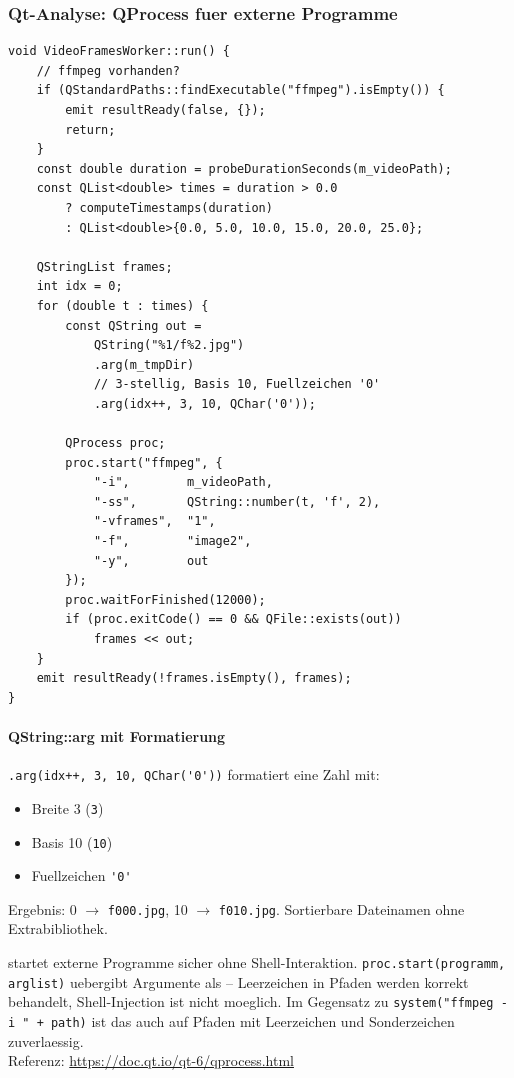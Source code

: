 \subsubsection{Qt-Analyse: QProcess fuer externe Programme}

\begin{lstlisting}[caption={run(): ffmpeg-Frames extrahieren}]
void VideoFramesWorker::run() {
    // ffmpeg vorhanden?
    if (QStandardPaths::findExecutable("ffmpeg").isEmpty()) {
        emit resultReady(false, {});
        return;
    }
    const double duration = probeDurationSeconds(m_videoPath);
    const QList<double> times = duration > 0.0
        ? computeTimestamps(duration)
        : QList<double>{0.0, 5.0, 10.0, 15.0, 20.0, 25.0};

    QStringList frames;
    int idx = 0;
    for (double t : times) {
        const QString out =
            QString("%1/f%2.jpg")
            .arg(m_tmpDir)
            // 3-stellig, Basis 10, Fuellzeichen '0'
            .arg(idx++, 3, 10, QChar('0'));

        QProcess proc;
        proc.start("ffmpeg", {
            "-i",        m_videoPath,
            "-ss",       QString::number(t, 'f', 2),
            "-vframes",  "1",
            "-f",        "image2",
            "-y",        out
        });
        proc.waitForFinished(12000);
        if (proc.exitCode() == 0 && QFile::exists(out))
            frames << out;
    }
    emit resultReady(!frames.isEmpty(), frames);
}
\end{lstlisting}

\paragraph{QString::arg mit Formatierung}
\verb|.arg(idx++, 3, 10, QChar('0'))| formatiert
eine Zahl mit:
\begin{itemize}[noitemsep]
  \item Breite 3 (\verb|3|)
  \item Basis 10 (\verb|10|)
  \item Fuellzeichen \verb|'0'|
\end{itemize}
Ergebnis: 0 $\to$ \verb|f000.jpg|, 10 $\to$ \verb|f010.jpg|.
Sortierbare Dateinamen ohne Extrabibliothek.

\begin{qtinfo}[title={Qt-Hintergrund: QProcess und Argumente}]
 startet externe Programme sicher ohne
Shell-Interaktion. \verb|proc.start(programm, arglist)|
uebergibt Argumente als  -- Leerzeichen
in Pfaden werden korrekt behandelt, Shell-Injection ist
nicht moeglich. Im Gegensatz zu
\verb|system("ffmpeg -i " + path)| ist das auch auf
Pfaden mit Leerzeichen und Sonderzeichen zuverlaessig.\\
Referenz: \url{https://doc.qt.io/qt-6/qprocess.html}
\end{qtinfo}

